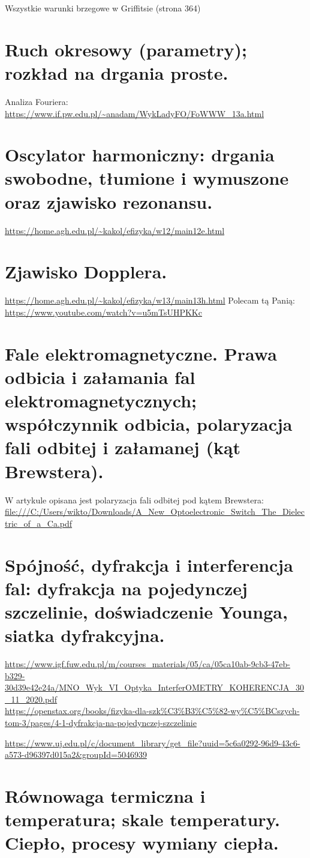\documentclass{article}
\begin{document}
Wszystkie warunki brzegowe w Griffitsie (strona 364)
\section{Ruch okresowy (parametry); rozkład na drgania proste.}
Analiza Fouriera: \url{https://www.if.pw.edu.pl/~anadam/WykLadyFO/FoWWW_13a.html}
\section{Oscylator harmoniczny: drgania swobodne, tłumione i wymuszone oraz zjawisko rezonansu.}
\url{https://home.agh.edu.pl/~kakol/efizyka/w12/main12e.html}
\section{Zjawisko Dopplera.}
\url{https://home.agh.edu.pl/~kakol/efizyka/w13/main13h.html}
Polecam tą Panią: \url{https://www.youtube.com/watch?v=u5mTsUHPKKc}
\section{Fale elektromagnetyczne. Prawa odbicia i załamania fal elektromagnetycznych; współczynnik odbicia, polaryzacja fali odbitej i załamanej (kąt Brewstera).}

W artykule opisana jest polaryzacja fali odbitej pod kątem Brewstera: \url{file:///C:/Users/wikto/Downloads/A_New_Optoelectronic_Switch_The_Dielectric_of_a_Ca.pdf}
\section{Spójność, dyfrakcja i interferencja fal: dyfrakcja na pojedynczej szczelinie, doświadczenie Younga, siatka dyfrakcyjna.}

\url{https://www.igf.fuw.edu.pl/m/courses_materials/05/ca/05ca10ab-9cb3-47eb-b329-30d39e42e24a/MNO_Wyk_VI_Optyka_InterferOMETRY_KOHERENCJA_30_11_2020.pdf} \\
\url{https://openstax.org/books/fizyka-dla-szk%C3%B3%C5%82-wy%C5%BCszych-tom-3/pages/4-1-dyfrakcja-na-pojedynczej-szczelinie}

\url{https://www.uj.edu.pl/c/document_library/get_file?uuid=5c6a0292-96d9-43c6-a573-d96397d015a2&groupId=5046939}

\section{Równowaga termiczna i temperatura; skale temperatury. Ciepło, procesy wymiany ciepła.}
\end{document}
